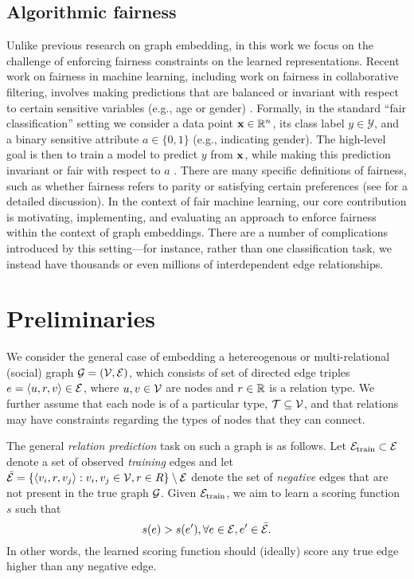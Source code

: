 \subsection{Algorithmic fairness}\label{sec:relatedfair}
Unlike previous research on graph embedding, in this work we focus on the challenge of enforcing fairness constraints on the learned representations. 
Recent work on fairness in machine learning, including work on fairness in collaborative filtering, involves making predictions that are balanced or invariant with respect to certain sensitive variables (e.g., age or gender) \cite{chouldechova2017fair,gajane2017formalizing,kamishima2012fairness,madras2018learning,zemel2013learning,yao2017new}. 
Formally, in the standard ``fair classification'' setting we consider a data point $\mathbf{x} \in \mathbb{R}^n$, its class label $y \in \mathcal{Y}$, and a binary sensitive attribute $a \in \{0,1\}$ (e.g., indicating gender). 
The high-level goal is then to train a model to predict $y$ from $\mathbf{x}$, while making this prediction invariant or fair with respect to $a$ \cite{madras2018learning}.
There are many specific definitions of fairness, such as whether fairness refers to parity or satisfying certain preferences (see \cite{gajane2017formalizing} for a detailed discussion). 
In the context of fair machine learning, our core contribution is motivating, implementing, and evaluating an approach to enforce fairness within the context of graph embeddings.
There are a number of complications introduced by this setting---for instance, rather than one classification task, we instead have thousands or even millions of interdependent edge relationships. 

\section{Preliminaries}

We consider the general case of embedding a hetereogenous or multi-relational (social) graph $\mathcal{G} = (\mathcal{V}, \mathcal{E})$, which consists of set of directed edge triples $e=\langle u, r, v \rangle \in \mathcal{E}$, where $u, v \in \mathcal{V}$ are nodes and $r \in \mathbb{R}$ is a relation type.
We further assume that each node is of a particular type, $\mathcal{T} \subseteq \mathcal{V}$, and that relations may have constraints regarding the types of nodes that they can connect. 

The general {\em relation prediction} task on such a  graph is as follows.
Let $\mathcal{E}_{\textrm{train}}\subset \mathcal{E}$ denote a set of observed {\em training} edges and let $\bar{\mathcal{E}} = \{\langle v_i, r, v_j \rangle : v_i, v_j \in \mathcal{V}, r \in R\} \setminus \mathcal{E}$ denote the set of {\em negative} edges that are not present in the true graph $\mathcal{G}$.
Given $\mathcal{E}_{\textrm{train}}$, we aim to learn a scoring function $s$ such that
\begin{equation}\label{eq:score}
    s(e) > s(e'), \forall e \in \mathcal{E}, e' \in \bar{\mathcal{E}}.
\end{equation}
In other words, the learned scoring function should (ideally) score any true edge higher than any negative edge. 

